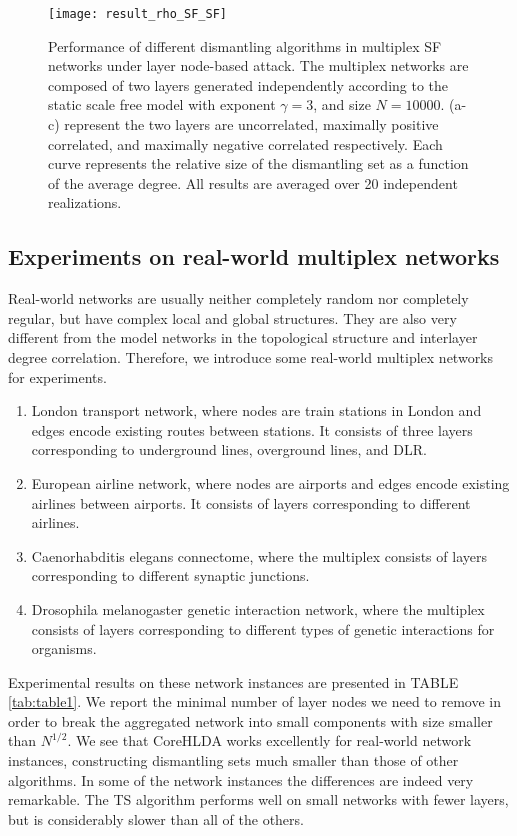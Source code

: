\documentclass[%
 aip,
 cha,
 amsmath,amssymb,
 reprint,%
]{revtex4-1}
\begin{document}
\begin{figure*}
\centering
\texttt{[image: result\_rho\_SF\_SF]}%
\caption{\label{fig:wide:rhoSFSF}Performance of different dismantling algorithms in multiplex SF networks under layer node-based attack. The multiplex networks are composed of two layers generated independently according to the static scale free model with exponent $\gamma=3$, and size $N=10000$. (a-c) represent the two layers are uncorrelated, maximally positive correlated, and maximally negative correlated respectively. Each curve represents the relative size of the dismantling set as a function of the average degree. All results are averaged over 20 independent realizations.}
\end{figure*}

\subsection{Experiments on real-world multiplex networks}
Real-world networks are usually neither completely random nor completely regular, but have complex local and global structures. They are also very different from the model networks in the topological structure and interlayer degree correlation. Therefore, we introduce some real-world multiplex networks for experiments.

\begin{enumerate}
    \item London transport network\cite{DeDomenico8351}, where nodes are train stations in London and edges encode existing routes between stations. It consists of three layers corresponding to underground lines, overground lines, and DLR.
    \item European airline network\cite{Cardillo2013}, where nodes are airports and edges encode existing airlines between airports. It consists of layers corresponding to different airlines.
    \item Caenorhabditis elegans connectome\cite{Chen4723,10.1093/comnet/cnu038}, where the multiplex consists of layers corresponding to different synaptic junctions.
    \item Drosophila melanogaster genetic interaction network\cite{10.1093/nar/gkj109,DeDomenico2015}, where the multiplex consists of layers corresponding to different types of genetic interactions for organisms.
\end{enumerate}

Experimental results on these network instances are presented in TABLE \ref{tab:table1}. We report the minimal number of layer nodes we need to remove in order to break the aggregated network into small components with size smaller than $N^{1/2}$. We see that CoreHLDA works excellently for real-world network instances, constructing dismantling sets much smaller than those of other algorithms. In some of the network instances the differences are indeed very remarkable. The TS algorithm performs well on small networks with fewer layers, but is considerably slower than all of the others.
\end{document}
